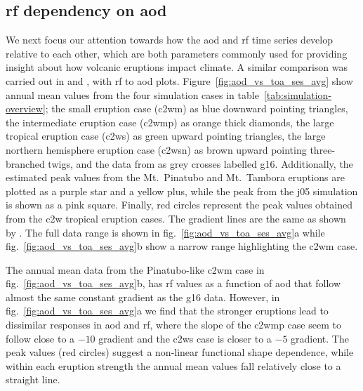\documentclass{ametsocV6.1}
\begin{document}
\subsection{\gls{rf} dependency on \gls{aod}}

We next focus our attention towards how the \gls{aod} and \gls{rf} time series develop
relative to each other, which are both parameters commonly used for providing insight
about how volcanic eruptions impact climate. A similar comparison was carried out in
\citet[][their Fig.\ 4]{gregory2016} and \citet[][their Fig.\ 1]{marshall2020}, with
\gls{rf} to \gls{aod} plots. Figure~\ref{fig:aod_vs_toa_ses_avg} show annual mean values
from the four simulation cases in table~\ref{tab:simulation-overview}; the small
eruption case (\gls{c2wm}) as blue downward pointing triangles, the intermediate
eruption case (\gls{c2wmp}) as orange thick diamonds, the large tropical eruption case
(\gls{c2ws}) as green upward pointing triangles, the large northern hemisphere eruption
case (\gls{c2wsn}) as brown upward pointing three-branched twigs, and the data from
\citet[][Fig.\ 4, black crosses from HadCM3 sstPiHistVol]{gregory2016} as grey crosses
labelled \gls{g16}. Additionally, the estimated peak values from the Mt.\
Pinatubo and Mt.\ Tambora eruptions are plotted as a purple star and a yellow plus,
while the peak from the \gls{j05} simulation is shown as a pink square. Finally, red
circles represent the peak values obtained from the \gls{c2w} tropical eruption cases.
The gradient lines are the same as shown by \citet{gregory2016}. The full data range is
shown in fig.~\ref{fig:aod_vs_toa_ses_avg}a while fig.~\ref{fig:aod_vs_toa_ses_avg}b
show a narrow range highlighting the \gls{c2wm} case.

The annual mean data from the Pinatubo-like \gls{c2wm} case in
fig.~\ref{fig:aod_vs_toa_ses_avg}b, has \gls{rf} values as a function of \gls{aod} that
follow almost the same constant gradient as the \gls{g16} data. However, in
fig.~\ref{fig:aod_vs_toa_ses_avg}a we find that the stronger eruptions lead to
dissimilar responses in \gls{aod} and \gls{rf}, where the slope of the \gls{c2wmp} case
seem to follow close to a \(-10\) gradient and the \gls{c2ws} case is closer to a \(-5\)
gradient. The peak values (red circles) suggest a non-linear functional shape
dependence, while within each eruption strength the annual mean values fall relatively
close to a straight line.
\end{document}
